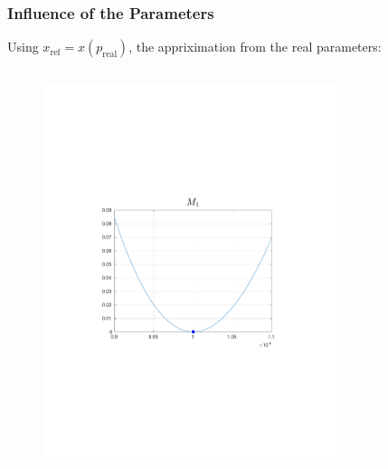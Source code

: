 \documentclass{beamer}
\begin{document}
\begin{frame}
    \frametitle{Influence of the Parameters}
    Using $x_{\text{ref}} = x(p_{\text{real}})$, the appriximation from the real parameters:
    \begin{columns}[t]
        \begin{figure}
            \centering
            \includegraphics[trim=4cm 4cm 4cm 8cm, clip=true, width=\linewidth]{img/MassApproxComp}
        \end{figure}
        \begin{figure}
            \centering

\end{figure}
\end{columns}
\end{frame}
\end{document}
